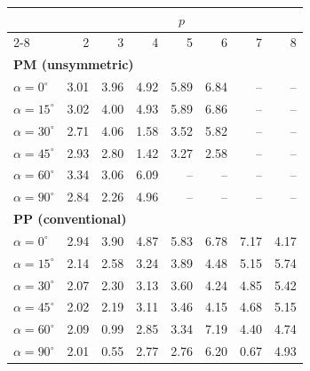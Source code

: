\begin{tabular}{lrrrrrrr}
\toprule
& \multicolumn{7}{c}{$p$}\\
\cmidrule(lr){2-8}
 & 2 & 3 & 4 & 5 & 6 & 7 & 8\\
\midrule
\multicolumn{8}{l}{\textbf{PM (unsymmetric)}}\\
$\alpha=0^\circ$ & 3.01 & 3.96 & 4.92 & 5.89 & 6.84 & -- & --\\
$\alpha=15^\circ$ & 3.02 & 4.00 & 4.93 & 5.89 & 6.86 & -- & --\\
$\alpha=30^\circ$ & 2.71 & 4.06 & 1.58 & 3.52 & 5.82 & -- & --\\
$\alpha=45^\circ$ & 2.93 & 2.80 & 1.42 & 3.27 & 2.58 & -- & --\\
$\alpha=60^\circ$ & 3.34 & 3.06 & 6.09 & -- & -- & -- & --\\
$\alpha=90^\circ$ & 2.84 & 2.26 & 4.96 & -- & -- & -- & --\\
\midrule
\multicolumn{8}{l}{\textbf{PP (conventional)}}\\
$\alpha=0^\circ$ & 2.94 & 3.90 & 4.87 & 5.83 & 6.78 & 7.17 & 4.17\\
$\alpha=15^\circ$ & 2.14 & 2.58 & 3.24 & 3.89 & 4.48 & 5.15 & 5.74\\
$\alpha=30^\circ$ & 2.07 & 2.30 & 3.13 & 3.60 & 4.24 & 4.85 & 5.42\\
$\alpha=45^\circ$ & 2.02 & 2.19 & 3.11 & 3.46 & 4.15 & 4.68 & 5.15\\
$\alpha=60^\circ$ & 2.09 & 0.99 & 2.85 & 3.34 & 7.19 & 4.40 & 4.74\\
$\alpha=90^\circ$ & 2.01 & 0.55 & 2.77 & 2.76 & 6.20 & 0.67 & 4.93\\
\bottomrule
\end{tabular}
